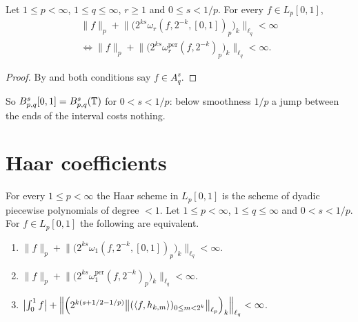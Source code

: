 \begin{corollary}
\label{cor:interval-circle}
\leanok
{}
Let $1 \leq p < \infty$, $1 \leq q \leq \infty$, $r \geq 1$ and $0 \leq s < 1/p$. For every
$f \in L_p[0,1]$,
\begin{multline*}
  \|f\|_p + \bigl\| \bigl( 2^{ks} \omega_r(f, 2^{-k}, [0,1])_p \bigr)_k \bigr\|_{\ell_q} < \infty \\
  \iff
  \|f\|_p + \bigl\| \bigl( 2^{ks} \omega_r^{\mathrm{per}}(f, 2^{-k})_p \bigr)_k \bigr\|_{\ell_q}
  < \infty .
\end{multline*}
\end{corollary}

\begin{proof}
\leanok
By  and  both conditions say $f \in A^s_q$.
\end{proof}

So $B^{s}_{p,q}[0,1] = B^{s}_{p,q}(\mathbb{T})$ for $0 < s < 1/p$: below smoothness $1/p$ a jump
between the ends of the interval costs nothing.

\section{Haar coefficients}
\label{sec:haar-coefficients}

\begin{corollary}
\label{cor:haar-besov}
\leanok
{}
For every $1 \leq p < \infty$ the Haar scheme in $L_p[0, 1]$ is the scheme of dyadic piecewise
polynomials of degree $< 1$. Let $1 \leq p < \infty$, $1 \leq q \leq \infty$ and $0 < s < 1/p$.
For $f \in L_p[0,1]$ the following are equivalent.
\begin{enumerate}
  \item $\|f\|_p + \bigl\| \bigl( 2^{ks} \omega_1(f, 2^{-k}, [0,1])_p \bigr)_k \bigr\|_{\ell_q}
    < \infty$.
  \item $\|f\|_p + \bigl\| \bigl( 2^{ks} \omega_1^{\mathrm{per}}(f, 2^{-k})_p \bigr)_k
    \bigr\|_{\ell_q} < \infty$.
  \item $\bigl| \int_0^1 f \bigr| + \Bigl\| \Bigl(2^{k(s + 1/2 - 1/p)}
    \bigl\| (\langle f, h_{k,m} \rangle)_{0 \leq m < 2^k} \bigr\|_{\ell_p} \Bigr)_k
    \Bigr\|_{\ell_q} < \infty$.
\end{enumerate}
\end{corollary}

